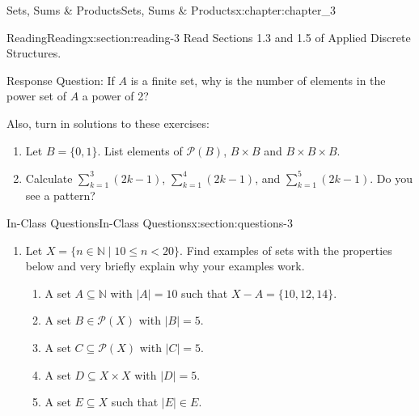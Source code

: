 \documentclass[oneside,10pt,]{book}
\numberwithin{equation}{section}
\newcommand{\lt}{<}
\begin{document}
%
%
\typeout{************************************************}
\typeout{************************************************}
%
\begin{chapterptx}{Sets, Sums \& Products}{}{Sets, Sums \& Products}{}{}{x:chapter:chapter_3}
%
%
%
%
%
\typeout{************************************************}
\typeout{************************************************}
%
\begin{sectionptx}{Reading}{}{Reading}{}{}{x:section:reading-3}
Read Sections 1.3 and 1.5 of Applied Discrete Structures.%
\par
Response Question:  If \(A\) is a finite set, why is the number of elements in the power set of \(A\) a power of 2?%
\par
Also, turn in solutions to these exercises:%
\begin{enumerate}[label=\arabic*.]
\item{}Let \(B=\{0,1\}\).  List elements of  \(\mathcal{P}(B)\),  \(B\times B\) and \(B\times B\times B\).%
\item{}Calculate \(\sum_{k=1}^3 (2k-1)\), \(\sum_{k=1}^4 (2k-1)\), and \(\sum_{k=1}^5 (2k-1)\). Do you see a pattern?%
\end{enumerate}
%
\end{sectionptx}
%
%
\typeout{************************************************}
\typeout{************************************************}
%
\begin{sectionptx}{In-Class Questions}{}{In-Class Questions}{}{}{x:section:questions-3}
%
\begin{enumerate}[label=\arabic*.]
\item{}Let \(X = \{n \in \mathbb{N} \mid 10 \leq n \lt 20\}\).  Find examples of sets with the properties below and very briefly explain why your examples work.%
\begin{enumerate}[label=(\alph*)]
\item{}A set \(A \subseteq \mathbb{N}\) with \(\lvert A \rvert = 10\) such that \(X - A = \{10, 12, 14\}\).%
\item{}A set \(B \in \mathcal{P}(X)\) with \(\lvert B\rvert = 5\).%
\item{}A set \(C \subseteq \mathcal{P}(X)\) with \(\lvert C\rvert = 5\).%
\item{}A set \(D \subseteq X \times X\) with \(\lvert D\rvert = 5\).%
\item{}A set \(E \subseteq X\) such that \(\lvert E\rvert \in E\).%

\end{enumerate}
\end{enumerate}
\end{sectionptx}
\end{chapterptx}
\end{document}
